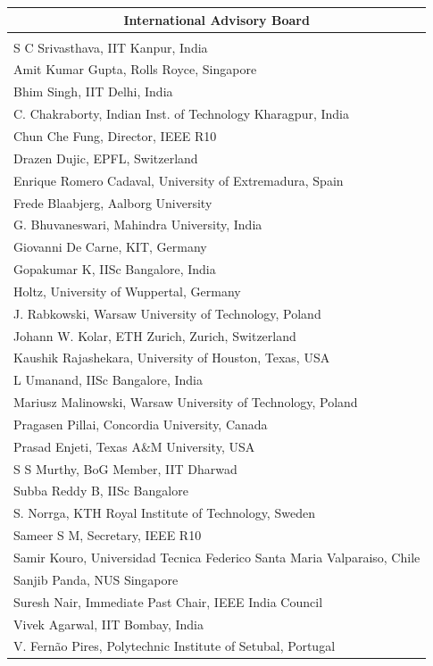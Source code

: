\begin{center}
\begin{tabular}{l}
\multicolumn{1}{c}{\textbf{International Advisory Board}}\\
\midrule
 \\
S C Srivasthava, IIT Kanpur, India\\ 
Amit Kumar Gupta, Rolls Royce, Singapore\\ 
Bhim Singh, IIT Delhi, India\\ 
C. Chakraborty, Indian Inst. of Technology Kharagpur, India\\ 
Chun Che Fung, Director, IEEE R10\\ 
Drazen Dujic, EPFL, Switzerland\\ 
Enrique Romero Cadaval, University of Extremadura, Spain\\ 
Frede Blaabjerg, Aalborg University\\ 
G. Bhuvaneswari, Mahindra University, India\\ 
Giovanni De Carne, KIT, Germany\\ 
Gopakumar K, IISc Bangalore, India\\ 
Holtz, University of Wuppertal, Germany\\ 
J. Rabkowski, Warsaw University of Technology, Poland\\ 
Johann W. Kolar, ETH Zurich, Zurich, Switzerland\\ 
Kaushik Rajashekara, University of Houston, Texas, USA\\ 
L Umanand, IISc Bangalore, India\\ 
Mariusz Malinowski, Warsaw University of Technology, Poland\\ 
Pragasen Pillai, Concordia University, Canada\\ 
Prasad Enjeti, Texas A\&M University, USA\\ 
S S Murthy, BoG Member, IIT Dharwad\\ 
Subba Reddy B, IISc Bangalore\\ 
S. Norrga, KTH Royal Institute of Technology, Sweden\\ 
Sameer S M, Secretary, IEEE R10\\ 
Samir Kouro, Universidad Tecnica Federico Santa Maria Valparaiso, Chile\\ 
Sanjib Panda, NUS Singapore\\ 
Suresh Nair, Immediate Past Chair, IEEE India Council\\ 
Vivek Agarwal, IIT Bombay, India\\ 
V. Fernão Pires, Polytechnic Institute of Setubal, Portugal\\ 

\end{tabular}
\end{center}
